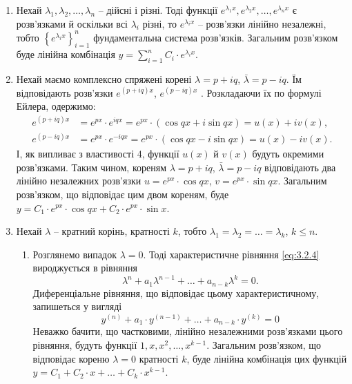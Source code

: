 \begin{enumerate}
\item Нехай $\lambda_1, \lambda_2, \ldots, \lambda_n$ -- дійсні і різні. Тоді функції $e^{\lambda_1 x}, e^{\lambda_2 x}, \ldots, e^{\lambda_n x}$ є розв’язками й оскільки всі $\lambda_i$ різні, то $e^{\lambda_i x}$ -- розв’язки лінійно незалежні, тобто $\left\{ e^{\lambda_i x} \right\}_{i = 1}^n$ фундаментальна система розв’язків. Загальним розв’язком буде лінійна комбінація $y = \sum_{i=1}^n C_i \cdot e^{\lambda_i x}$.
\item Нехай маємо комплексно спряжені корені $\lambda=p+iq$, $\bar\lambda=p-iq$. Їм відповідають розв’язки $e^{(p+iq)x}$, $e^{(p-iq)x}$ . Розкладаючи їх по формулі Ейлера, одержимо: 
\begin{align}
	\label{eq:3.2.5}
	e^{(p+iq)x} &= e^{px} \cdot e^{iqx} = e^{px} \cdot (\cos qx + i \sin qx) = u(x) + i v(x), \\
	\label{eq:3.2.6}
	e^{(p-iq)x} &= e^{px} \cdot e^{-iqx} = e^{px} \cdot (\cos qx - i \sin qx) = u(x) - i v(x).
\end{align}
І, як випливає з властивості 4, функції $u(x)$ й $v(x)$ будуть окремими розв’язками. Таким чином, кореням $\lambda = p + iq$, $\bar\lambda = p - iq$ відповідають два лінійно незалежних розв’язки $u = e^{px} \cdot \cos qx$, $v = e^{px} \cdot \sin qx$. Загальним розв’язком, що відповідає цим двом кореням, буде $y = C_1 \cdot e^{px} \cdot \cos qx + C_2 \cdot e^{px} \cdot \sin x$.
\item Нехай $\lambda$ -- кратний корінь, кратності $k$, тобто $\lambda_1 = \lambda_2 = \ldots = \lambda_k$, $k\le n$.
\begin{enumerate}
\item Розглянемо випадок $\lambda=0$. Тоді характеристичне рівняння \eqref{eq:3.2.4} вироджується в рівняння
\begin{equation}
	\label{eq:3.2.7}
	\lambda^n + a_1 \lambda^{n - 1} + \ldots + a_{n - k} \lambda^k = 0.
\end{equation}
 	Диференціальне рівняння, що відповідає цьому характеристичному, запишеться у вигляді
\begin{equation}
	\label{eq:3.2.8}
	y^{(n)} + a_1 \cdot y^{(n - 1)} + \ldots + a_{n-k} \cdot y^{(k)} = 0
\end{equation}
 	Неважко бачити, що частковими, лінійно незалежними роз\-в’я\-з\-ка\-ми цього рівняння, будуть функції $1, x, x^2, \ldots, x^{k-1}$. Загальним роз\-в’я\-з\-ком, що відповідає кореню $\lambda=0$ кратності $k$, буде лінійна комбінація цих функцій $y = C_1 + C_2 \cdot x + \ldots + C_k \cdot x^{k - 1}$.

\end{enumerate}
\end{enumerate}
